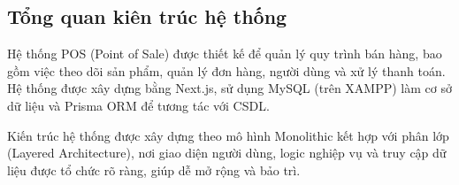 \documentclass[a4paper]{article}
\begin{document}
\subsection{Tổng quan kiên trúc hệ thống}
\quad Hệ thống POS (Point of Sale) được thiết kế để quản lý quy trình bán hàng, bao gồm việc theo dõi sản phẩm, quản lý đơn hàng, người dùng và xử lý thanh toán. Hệ thống được xây dựng bằng Next.js, sử dụng MySQL (trên XAMPP) làm cơ sở dữ liệu và Prisma ORM để tương tác với CSDL.

\vspace{0.8em}

\quad Kiến trúc hệ thống được xây dựng theo mô hình Monolithic kết hợp với phân lớp (Layered Architecture), nơi giao diện người dùng, logic nghiệp vụ và truy cập dữ liệu được tổ chức rõ ràng, giúp dễ mở rộng và bảo trì.
\end{document}
